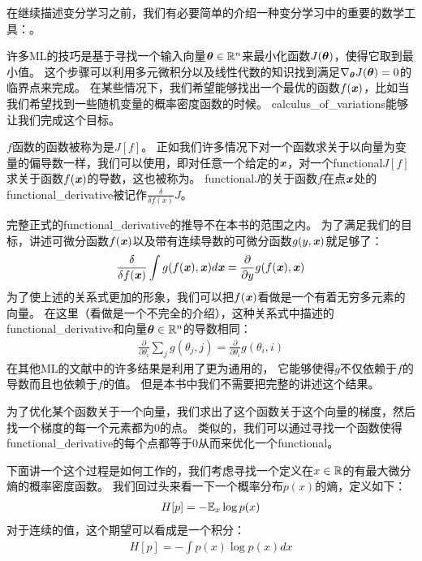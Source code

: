 在继续描述变分学习之前，我们有必要简单的介绍一种变分学习中的重要的数学工具：。


许多\gls{ML}的技巧是基于寻找一个输入向量$\boldsymbol{\theta}\in\mathbb{R}^n$来最小化函数$J(\boldsymbol{\theta})$，使得它取到最小值。
这个步骤可以利用多元微积分以及线性代数的知识找到满足$\nabla_{\boldsymbol{\theta}} J(\boldsymbol{\theta}) = 0$的临界点来完成。
在某些情况下，我们希望能够找出一个最优的函数$f(\boldsymbol{\mathit{x}})$，比如当我们希望找到一些随机变量的概率密度函数的时候。
\gls{calculus_of_variations}能够让我们完成这个目标。



$f$函数的函数被称为是$J[f]$。
正如我们许多情况下对一个函数求关于以向量为变量的偏导数一样，我们可以使用，即对任意一个给定的$\boldsymbol{\mathit{x}}$，对一个\gls{functional}$J[f]$求关于函数$f(\boldsymbol{\mathit{x}})$的导数，这也被称为。
\gls{functional}$J$的关于函数$f$在点$\boldsymbol{\mathit{x}}$处的\gls{functional_derivative}被记作$\frac{\delta}{\delta f(x)}J$。



完整正式的\gls{functional_derivative}的推导不在本书的范围之内。
为了满足我们的目标，讲述可微分函数$f(\boldsymbol{\mathit{x}})$以及带有连续导数的可微分函数$g(y,\boldsymbol{\mathit{x}})$就足够了：
\begin{align}
	\frac{\delta}{\delta f(\boldsymbol{\mathit{x}})} \int g(f(\boldsymbol{\mathit{x}}),\boldsymbol{\mathit{x}})d\boldsymbol{\mathit{x}} = \frac{\partial}{\partial y}g(f(\boldsymbol{\mathit{x}}),\boldsymbol{\mathit{x}})
\end{align}
为了使上述的关系式更加的形象，我们可以把$f(\boldsymbol{\mathit{x}})$看做是一个有着无穷多元素的向量。
在这里（看做是一个不完全的介绍），这种关系式中描述的\gls{functional_derivative}和向量$\boldsymbol{\theta}\in\mathbb{R}^n$的导数相同：
\begin{align}
	\frac{\partial}{\partial \theta_i}\sum_{j}^{}g(\theta_j,j)
	= \frac{\partial}{\partial \theta_i}g(\theta_i,i)
\end{align}
在其他\gls{ML}的文献中的许多结果是利用了更为通用的，
它能够使得$g$不仅依赖于$f$的导数而且也依赖于$f$的值。
但是本书中我们不需要把完整的讲述这个结果。


为了优化某个函数关于一个向量，我们求出了这个函数关于这个向量的梯度，然后找一个梯度的每一个元素都为0的点。
类似的，我们可以通过寻找一个函数使得\gls{functional_derivative}的每个点都等于0从而来优化一个\gls{functional}。


下面讲一个这个过程是如何工作的，我们考虑寻找一个定义在$x\in\mathbb{R}$的有最大微分熵的概率密度函数。
我们回过头来看一下一个概率分布$p(x)$的熵，定义如下：
\begin{align}
	H[p] = - \mathbb{E}_x \log p(x)
\end{align}
对于连续的值，这个期望可以看成是一个积分：
\begin{align}
	H[p] = - \int p(x) \log p(x) dx
\end{align}


